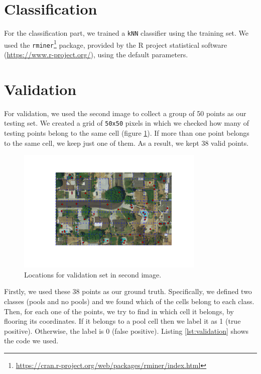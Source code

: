 \documentclass{article}
\begin{document}
\FloatBarrier

\section{Classification}\label{sec:class}
For the classification part, we trained a \texttt{kNN} classifier using the training set.  We used the \texttt{rminer}\footnote{\url{https://cran.r-project.org/web/packages/rminer/index.html}} package, provided by the R project statistical software (\url{https://www.r-project.org/}), using the default parameters. 

\section{Validation}
For validation, we used the second image to collect a group of 50 points as our testing set. We created a grid of \texttt{50x50} pixels in which we checked how many of testing points belong to the same cell (figure \ref{fig:locations}). If more than one point belongs to the same cell, we keep just one of them. As a result, we kept 38 valid points. 

\begin{figure}
 \centering
 \includegraphics[trim=80 60 70 50 , clip, width=0.8\textwidth]{../figures/grid3.pdf}
 \caption{Locations for validation set in second image.}
 \label{fig:locations}
\end{figure}

Firstly, we used these 38 points as our ground truth. Specifically, we defined two classes (pools and no pools) and we found which of the cells belong to each class. Then, for each one of the points, we try to find in which cell it belongs, by flooring its coordinates. If it belongs to a pool cell then we label it as 1 (true positive). Otherwise, the label is 0 (false positive).  Listing \ref{lst:validation} shows the code we used. 
\end{document}

